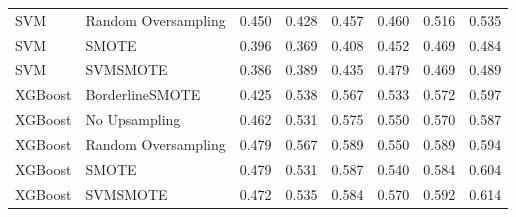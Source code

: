 \begin{tabular}{llllllll}
                         SVM & Random Oversampling & 0.450 &                     0.428 &                 0.457 &                  0.460 &                                   0.516 &    0.535 \\
                         SVM &               SMOTE & 0.396 &                     0.369 &                 0.408 &                  0.452 &                                   0.469 &    0.484 \\
                         SVM &            SVMSMOTE & 0.386 &                     0.389 &                 0.435 &                  0.479 &                                   0.469 &    0.489 \\
                     XGBoost &     BorderlineSMOTE & 0.425 &                     0.538 &                 0.567 &                  0.533 &                                   0.572 &    0.597 \\
                     XGBoost &       No Upsampling & 0.462 &                     0.531 &                 0.575 &                  0.550 &                                   0.570 &    0.587 \\
                     XGBoost & Random Oversampling & 0.479 &                     0.567 &                 0.589 &                  0.550 &                                   0.589 &    0.594 \\
                     XGBoost &               SMOTE & 0.479 &                     0.531 &                 0.587 &                  0.540 &                                   0.584 &    0.604 \\
                     XGBoost &            SVMSMOTE & 0.472 &                     0.535 &                 0.584 &                  0.570 &                                   0.592 &    0.614 \\
\bottomrule
\end{tabular}
